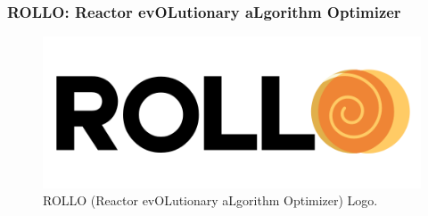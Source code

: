 \begin{frame}
    \frametitle{ROLLO: Reactor evOLutionary aLgorithm Optimizer}
    \begin{minipage}[c]{\textwidth}
        \centering
        \begin{figure}
            \includegraphics[width=0.5\linewidth]{figures/rollo-logo.png} 
            \caption{ROLLO (Reactor evOLutionary aLgorithm Optimizer) Logo.}
        \end{figure}
    \end{minipage}
\end{frame}